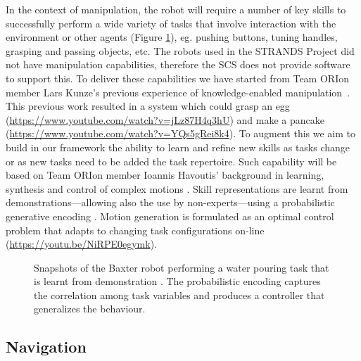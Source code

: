 \documentclass[runningheads,a4paper]{llncs}
\newcommand{\teamori}{Team ORIon}
\begin{document}
In the context of manipulation, the robot will require a number of key skills 
to successfully perform a wide
variety of tasks that involve interaction with the environment or other
agents (Figure \ref{fig:baxter_water_task}), eg. pushing buttons, tuning handles, grasping and passing objects, etc. 
% 
The robots used in the STRANDS Project did not have manipulation capabilities, therefore the SCS does not provide software to support this. To deliver these capabilities we have started from \teamori{} member Lars Kunze's previous experience of knowledge-enabled manipulation~\cite{kunze15aij}. This previous work resulted in a system which could grasp an egg (\url{https://www.youtube.com/watch?v=jLz87H4q3hU}) and make a pancake (\url{https://www.youtube.com/watch?v=YQs5gRei8k4}). 
%
To augment this we aim to build in our framework the ability
to learn and refine new skills as tasks change or as new tasks need to be added
the task repertoire. Such capability will be based on \teamori{} 
member Ioannis Havoutis' background in learning, synthesis and control of 
complex motions \cite{Havoutis16SSRR}. Skill representations
are learnt from demonstrations---allowing also the use by non-experts---using a probabilistic generative encoding %
\cite{Havoutis17ICRA}. Motion generation is formulated as an optimal
control problem that adapts to changing task configurations on-line \cite{Zeestraten17IROS,Zeestraten2017-RAL} (\url{https://youtu.be/NiRPE0egymk}).
\begin{figure}[!t]
	\centering
	\vspace{-10pt}%
	\caption{Snapshots of the Baxter robot performing a water pouring task that
	is learnt from demonstration \cite{Zeestraten2017-RAL}. The probabilistic
	encoding captures the correlation among task variables and produces a
	controller that generalizes the behaviour.}
	\label{fig:baxter_water_task}
	\vspace{-3ex}
\end{figure}

\subsection{Navigation}
\end{document}
